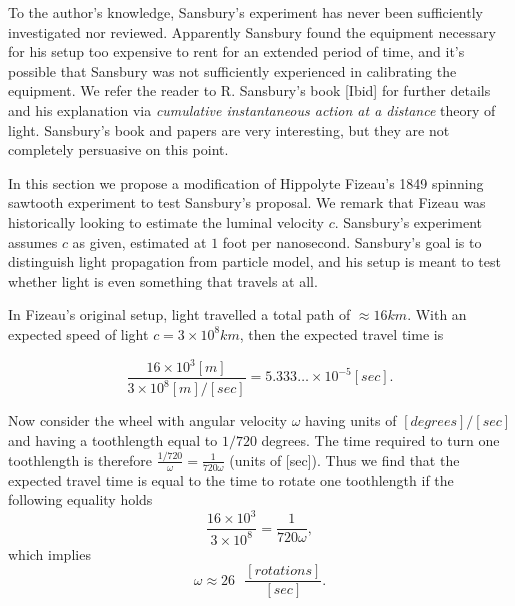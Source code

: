 \documentclass[12pt]{article}
\begin{document}

To the author's knowledge, Sansbury's experiment has never been sufficiently investigated nor reviewed. Apparently Sansbury found the equipment necessary for his setup too expensive to rent for an extended period of time, and it's possible that Sansbury was not sufficiently experienced in calibrating the equipment. We refer the reader to R. Sansbury's book [Ibid] for further details and his explanation via \emph{cumulative instantaneous action at a distance} theory of light. Sansbury's book and papers are very interesting, but they are not completely persuasive on this point.

In this section we propose a modification of Hippolyte Fizeau's 1849 spinning sawtooth experiment to test Sansbury's proposal. We remark that Fizeau was historically looking to estimate the luminal velocity $c$. Sansbury's experiment assumes $c$ as given, estimated at $1$ foot per nanosecond. Sansbury's goal is to distinguish light propagation from particle model, and his setup is meant to test whether light is even something that travels at all. 

In Fizeau's original setup, light travelled a total path of $\approx 16 km$. With an expected speed of light $c=3\times 10^8 km$, then the expected travel time is 

\begin{equation}
\frac{16 \times 10^3 [m]}{3 \times 10^8 [m]/[sec]}=5.333\ldots \times 10^{-5} [sec].\end{equation} 

Now consider the wheel with angular velocity $\omega$ having units of $[degrees]/[sec]$ and having a toothlength equal to $1/720$ degrees. The time required to turn one toothlength is therefore $\frac{1/720}{\omega}=\frac{1}{720 \omega}$ (units of [sec]). Thus we find that the expected travel time is equal to the time to rotate one toothlength if the following equality holds $$\frac{16 \times 10^3 }{3 \times 10^8} = \frac{1}{720 \omega}, $$ which implies $$\omega \approx 26 ~~~\frac{[rotations]}{[sec]}.$$
\end{document}
